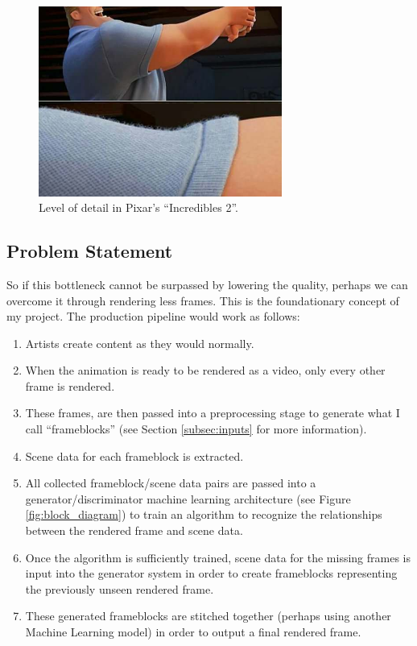 \documentclass[conference]{IEEEtran}
\begin{document}
\begin{figure}[htbp]
\centerline{\includegraphics[width=8cm]{incredibles.png}}
\caption{Level of detail in Pixar's ``Incredibles 2''.}
\label{fig:incredibles}
\end{figure}

\subsection{Problem Statement}
\label{subsec:problem_statement}
So if this bottleneck cannot be surpassed by lowering the quality, perhaps we
can overcome it through rendering less frames. This is the foundationary concept
of my project. The production pipeline would work as follows:

\begin{enumerate}
\item Artists create content as they would normally.
\item When the animation is ready to be rendered as a video, only every other
frame is rendered.
\item These frames, are then passed into a preprocessing stage to generate
what I call
``frameblocks'' (see Section \ref{subsec:inputs} for more information).
\item Scene data for each frameblock is extracted.
\item All collected frameblock/scene data pairs are passed into a generator/discriminator
machine learning architecture (see Figure \ref{fig:block_diagram}) to train an algorithm
to recognize the relationships between the rendered frame and scene data.
\item Once the algorithm is sufficiently trained, scene data for the missing
frames is input into the generator system in order to create frameblocks
representing the previously unseen rendered frame.
\item These generated frameblocks are stitched together (perhaps using another Machine
Learning model) in order to output a final rendered frame.
\end{enumerate}
\end{document}
